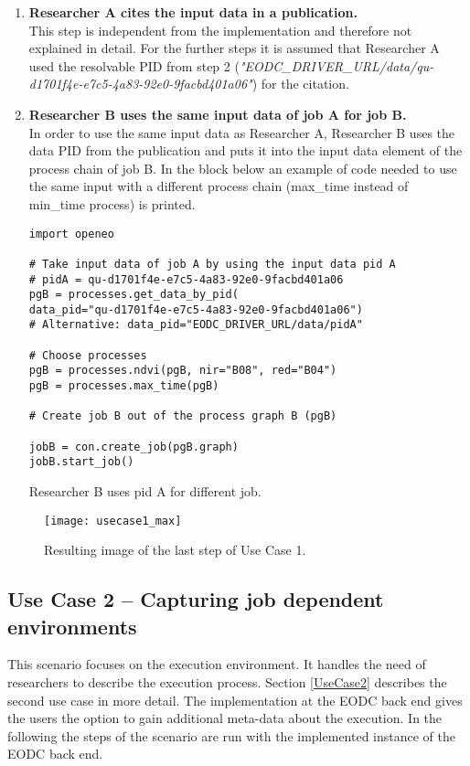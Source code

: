 \documentclass[draft,final]{vutinfth} %
\newenvironment{code}{\captionsetup{type=listing}}{}
\begin{document}
\begin{enumerate}
	\item \textbf{Researcher A cites the input data in a publication.} \\
	This step is independent from the implementation and therefore not explained in detail. For the further steps it is assumed that Researcher A used the resolvable PID from step 2 (\textit{"EODC\_DRIVER\_URL/data/qu-d1701f4e-e7c5-4a83-92e0-9facbd401a06"}) for the citation.   
	
	\item \textbf{Researcher B uses the same input data of job A for job B.} \\
	In order to use the same input data as Researcher A, Researcher B uses the data PID from the publication and puts it into the input data element of the process chain of job B. In the block below an example of code needed to use the same input with a different process chain (max\_time instead of min\_time process) is printed.   

\begin{code}
	\begin{verbatim}
import openeo

# Take input data of job A by using the input data pid A
# pidA = qu-d1701f4e-e7c5-4a83-92e0-9facbd401a06
pgB = processes.get_data_by_pid(
data_pid="qu-d1701f4e-e7c5-4a83-92e0-9facbd401a06")
# Alternative: data_pid="EODC_DRIVER_URL/data/pidA" 

# Choose processes
pgB = processes.ndvi(pgB, nir="B08", red="B04")
pgB = processes.max_time(pgB)

# Create job B out of the process graph B (pgB)

jobB = con.create_job(pgB.graph)
jobB.start_job()
	\end{verbatim}
	\caption{Researcher B uses pid A for different job.}
	\label{lst:impl_usecase1_3}
\end{code}
	
\end{enumerate}

\begin{figure}[h]
	\centering
	\texttt{[image: usecase1\_max]}
	\caption{Resulting image of the last step of Use Case 1.}
	\label{fig:impl_usecase1_max} %
\end{figure}

\subsection{Use Case 2 – Capturing job dependent environments}\label{Implementation:Use Case2}
This scenario focuses on the execution environment. It handles the need of researchers to describe the execution process. Section \ref{UseCase2} describes the second use case in more detail. The implementation at the EODC back end gives the users the option to gain additional meta-data about the execution. In the following the steps of the scenario are run with the implemented instance of the EODC back end.    
\end{document}

